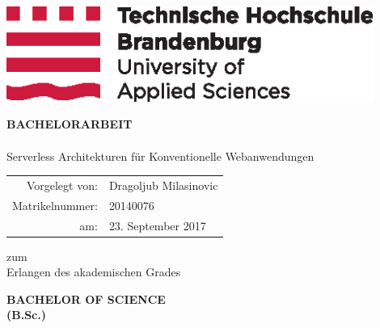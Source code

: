 \documentclass[
12pt,
english,
ngerman,
headsepline,
twoside,
openright,
numbers=noenddot,version=first
]{scrreprt}
\providecommand{\tabularnewline}{\\}
\begin{document}
\titlepage

\begin{center}
\includegraphics[width=12cm]{pics/2015_10_05_THB_Logo_CMYK_randlos}\vspace{0.5cm}

\par\end{center}

\vspace{1cm}

\noindent \begin{center}
\textsf{\textbf{\large BACHELORARBEIT}}\textsf{}\\

\textsf{}\\
\textsf{\huge Serverless Architekturen für Konventionelle Webanwendungen}
\par\end{center}{\Large \par}

\vspace{2cm}

\noindent \begin{center}
{\huge }\begin{tabular}{rl}
Vorgelegt von: & Dragoljub Milasinovic\tabularnewline
Matrikelnummer: & 20140076\tabularnewline
am: & 23. September 2017\tabularnewline
\end{tabular}
\par\end{center}{\huge \par}

\vspace{1cm}

\noindent \begin{center}
zum \\
Erlangen des akademischen Grades\textsf{}\\
\par\end{center}
\noindent \begin{center}
\textsf{\textbf{\large BACHELOR OF SCIENCE}}\textsf{\textbf{\LARGE }}\\
\textsf{\textbf{(B.Sc.)}}
\par\end{center}
\end{document}
